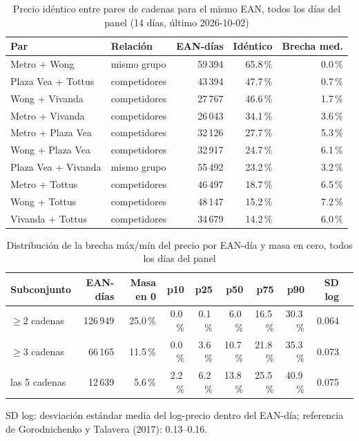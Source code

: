 
\begin{table}[htbp]
\caption{Precio id\'entico entre pares de cadenas para el mismo EAN, todos los d\'ias del panel (14 d\'ias, \'ultimo 2026-10-02)}
\label{tab:identidad}
\centering\scriptsize\setlength{\tabcolsep}{3pt}
\begin{tabular}{@{}llrrr@{}}
\toprule
Par & Relaci\'on & EAN-d\'ias & Id\'entico & Brecha med. \\
\midrule
Metro + Wong & mismo grupo & 59\,394 & 65.8\,\% & 0.0\,\% \\
Plaza Vea + Tottus & competidores & 43\,394 & 47.7\,\% & 0.7\,\% \\
Wong + Vivanda & competidores & 27\,767 & 46.6\,\% & 1.7\,\% \\
Metro + Vivanda & competidores & 26\,043 & 34.1\,\% & 3.6\,\% \\
Metro + Plaza Vea & competidores & 32\,126 & 27.7\,\% & 5.3\,\% \\
Wong + Plaza Vea & competidores & 32\,917 & 24.7\,\% & 6.1\,\% \\
Plaza Vea + Vivanda & mismo grupo & 55\,492 & 23.2\,\% & 3.2\,\% \\
Metro + Tottus & competidores & 46\,497 & 18.7\,\% & 6.5\,\% \\
Wong + Tottus & competidores & 48\,147 & 15.2\,\% & 7.2\,\% \\
Vivanda + Tottus & competidores & 34\,679 & 14.2\,\% & 6.0\,\% \\
\bottomrule\end{tabular}\end{table}

\begin{table}[t]
\caption{Distribuci\'on de la brecha m\'ax/m\'in del precio por EAN-d\'ia y masa en cero, todos los d\'ias del panel}
\label{tab:brecha}
\centering\scriptsize\setlength{\tabcolsep}{4pt}
\begin{tabular}{@{}lrrrrrrrrr@{}}
\toprule
Subconjunto & EAN-d\'ias & Masa en 0 & p10 & p25 & p50 & p75 & p90 & SD log \\
\midrule
$\geq 2$ cadenas & 126\,949 & 25.0\,\% & 0.0\,\% & 0.1\,\% & 6.0\,\% & 16.5\,\% & 30.3\,\% & 0.064 \\
$\geq 3$ cadenas & 66\,165 & 11.5\,\% & 0.0\,\% & 3.6\,\% & 10.7\,\% & 21.8\,\% & 35.3\,\% & 0.073 \\
las 5 cadenas & 12\,639 & 5.6\,\% & 2.2\,\% & 6.2\,\% & 13.8\,\% & 25.5\,\% & 40.9\,\% & 0.075 \\
\bottomrule\end{tabular}
\par\smallskip\raggedright\scriptsize SD log: desviaci\'on est\'andar media del log-precio dentro del EAN-d\'ia; referencia de Gorodnichenko y Talavera (2017): 0.13--0.16.
\end{table}

